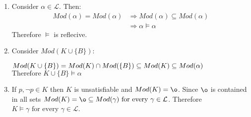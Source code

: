 \begin{enumerate}
    \item Consider $\alpha \in \mathcal{L}$. Then:\\
    \begin{align*}
        Mod(\alpha) = Mod(\alpha) &\Rightarrow Mod(\alpha) \subseteq Mod(\alpha)\\
        &\Rightarrow \alpha \models \alpha
    \end{align*}
    Therefore $\models$ is reflecive.

    \item Consider $Mod(K \cup \{B\})$:
    
        $Mod(K \cup \{B\}) = Mod(K) \cap Mod(\{B\}) \subseteq Mod(K) \subseteq Mod(\alpha)\\$
        $\text{Therefore } K \cup \{B\} \models \alpha$
    
    \item If $p, \neg p \in K$ then $K$ is unsatisfiable and $Mod(K) = \o$. Since $\o$ is contained in all sets $Mod(K) = \o \subseteq Mod(\gamma) \text{ for every } \gamma \in \mathcal{L}$. Therefore $K \models \gamma \text{ for every } \gamma \in \mathcal{L}$.
\end{enumerate}